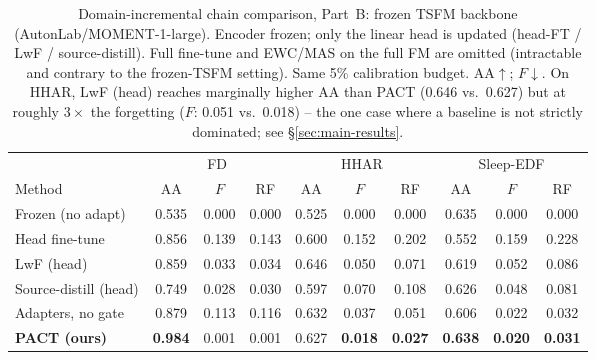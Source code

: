 \begin{table}[t]
\centering
\caption{Domain-incremental chain comparison, Part~B: frozen TSFM backbone
(AutonLab/MOMENT-1-large). Encoder frozen; only the linear head is updated
(head-FT / LwF / source-distill). Full fine-tune and EWC/MAS on the full FM
are omitted (intractable and contrary to the frozen-TSFM setting). Same 5\%
calibration budget. AA$\uparrow$; $F$$\downarrow$. On HHAR, LwF (head)
reaches marginally higher AA than PACT (0.646 vs.\ 0.627) but at roughly
$3\times$ the forgetting ($F$: 0.051 vs.\ 0.018) -- the one case where a
baseline is not strictly dominated; see \S\ref{sec:main-results}.}
\label{tab:chain-moment}
\small
\begin{tabular}{l ccc ccc ccc}
\toprule
& \multicolumn{3}{c}{FD} & \multicolumn{3}{c}{HHAR} & \multicolumn{3}{c}{Sleep-EDF}\\
\cmidrule(lr){2-4}\cmidrule(lr){5-7}\cmidrule(lr){8-10}
Method & AA & $F$ & RF & AA & $F$ & RF & AA & $F$ & RF\\
\midrule
Frozen (no adapt) & 0.535 & 0.000 & 0.000 & 0.525 & 0.000 & 0.000 & 0.635 & 0.000 & 0.000\\
Head fine-tune & 0.856 & 0.139 & 0.143 & 0.600 & 0.152 & 0.202 & 0.552 & 0.159 & 0.228\\
LwF (head) & 0.859 & 0.033 & 0.034 & 0.646 & 0.050 & 0.071 & 0.619 & 0.052 & 0.086\\
Source-distill (head) & 0.749 & 0.028 & 0.030 & 0.597 & 0.070 & 0.108 & 0.626 & 0.048 & 0.081\\
Adapters, no gate & 0.879 & 0.113 & 0.116 & 0.632 & 0.037 & 0.051 & 0.606 & 0.022 & 0.032\\
\textbf{PACT (ours)} & \textbf{0.984} & 0.001 & 0.001 & 0.627 & \textbf{0.018} & \textbf{0.027} & \textbf{0.638} & \textbf{0.020} & \textbf{0.031}\\
\bottomrule
\end{tabular}
\end{table}

